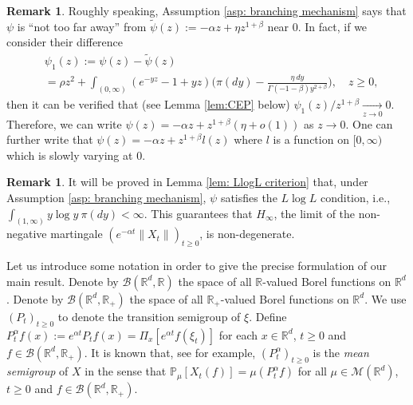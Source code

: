 \documentclass[12pt,a4paper]{amsart}
\theoremstyle{plain}
\theoremstyle{definition}
\newtheorem{rem}[thm]{Remark}
\numberwithin{equation}{section}
\begin{document}
\begin{rem}
  \label{rem:SP}
Roughly speaking, Assumption \ref{asp: branching mechanism} says that $\psi$ is ``not too far away'' from $\widetilde \psi(z) := - \alpha z + \eta z^{1+\beta}$ near $0$.
In fact, if we consider their difference
\begin{align}
  \label{eq:PB}
  & \psi_1(z)
  := \psi(z) - \widetilde \psi(z)
  \\ &= \rho z^2+ \int_{(0,\infty)}(e^{-yz}-1+yz) \Big(\pi(dy) - \frac{\eta~dy}{\Gamma(-1-\beta) y^{2+\beta}}\Big),
  \quad z\geq 0,
\end{align}
then it can be verified that (see Lemma \ref{lem:CEP} below) $\psi_1(z)/z^{1+\beta} \xrightarrow[z\to 0]{} 0$.
Therefore, we can write $ \psi(z)  = - \alpha z + z^{1+\beta}(\eta + o(1))$ as $z\to 0$.
One can further write that $\psi(z) = - \alpha z + z^{1+\beta} l(z)$ where $l$ is a function on $[0,\infty)$ which is slowly varying at $0$.
\end{rem}

\begin{rem}
It will be proved in Lemma \ref{lem: LlogL criterion} that, under Assumption \ref{asp: branching mechanism},
 $\psi$ satisfies the $L \log L$ condition, i.e., $ \int_{(1,\infty)} y\log y~\pi(dy) < \infty. $
This guarantees that $H_\infty$, the limit of the non-negative martingale $(e^{-\alpha t} \|X_t\|)_{t\geq 0}$, is non-degenerate.
\end{rem}
Let us introduce some notation in order to give the precise formulation of our main result.
Denote by $\mathcal B(\mathbb R^d, \mathbb R)$ the space of all $\mathbb R$-valued Borel functions on $\mathbb R^d$.
Denote by $\mathcal B(\mathbb R^d, \mathbb R_+)$ the space of all $\mathbb R_+$-valued Borel functions on $\mathbb R^d$.
We use  $(P_t)_{t\geq 0}$ to denote the transition semigroup of $\xi$.	
Define
\(
P^{\alpha}_t f(x)
  := e^{\alpha t} P_t f(x)
  = \Pi_x [e^{\alpha t}f(\xi_t)]
\)
for each $x\in \mathbb R^d$, $t\geq 0$ and $f\in \mathcal B(\mathbb R^d, \mathbb R_+)$.
It is known that, see \cite[Proposition 2.27]{Li2011Measure-valued} for example, $(P^\alpha_t)_{t\geq 0}$ is the \emph{mean semigroup} of $X$ in the sense that
\(
  \mathbb{P}_{\mu}[X_t (f)]  = \mu( P^\alpha_t f)
\)
for all $\mu\in \mathcal M(\mathbb R^d)$, $t\geq 0$ and $f\in \mathcal B(\mathbb R^d, \mathbb R_+)$.
\end{document}
